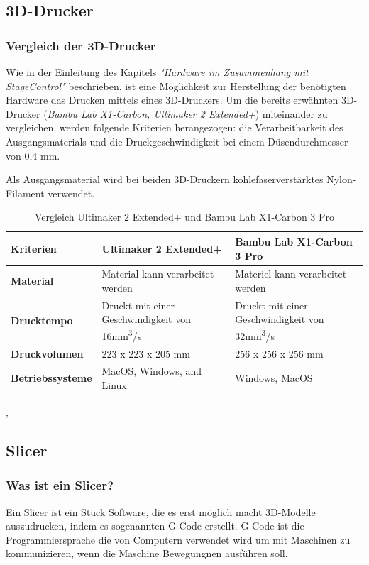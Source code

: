 \subsection{3D-Drucker}

\subsubsection{Vergleich der 3D-Drucker}
Wie in der Einleitung des Kapitels \emph{"Hardware im Zusammenhang mit StageControl"} beschrieben, ist eine Möglichkeit zur Herstellung der benötigten Hardware das Drucken mittels eines 3D-Druckers. Um die bereits erwähnten 3D-Drucker (\emph{Bambu Lab X1-Carbon, Ultimaker 2 Extended+}) miteinander zu vergleichen, werden folgende Kriterien herangezogen: die Verarbeitbarkeit des Ausgangsmaterials und die Druckgeschwindigkeit bei einem Düsendurchmesser von 0,4 mm. 

Als Ausgangsmaterial wird bei beiden 3D-Druckern kohlefaserverstärktes Nylon-Filament verwendet.

\begin{table} [H]
	\begin{tabular}{ |p{2.7cm} |p{4.8cm}|p{4.8cm}| }
		\hline
		 \textbf{Kriterien} & \textbf{Ultimaker 2 Extended+}& \textbf{Bambu Lab X1-Carbon 3 Pro}\\
		\hline
		\textbf{Material} & Material kann verarbeitet werden & Materiel kann verarbeitet werden   \\ 
		\hline
		\textbf{Drucktempo} & Druckt mit einer Geschwindigkeit von 16mm\textsuperscript{3}/s & Druckt mit einer Geschwindigkeit von 32mm\textsuperscript{3}/s   \\  
		\hline
		\textbf{Druckvolumen} & 223 x 223 x 205 mm & 256 x 256 x 256 mm \\
		\hline
		\textbf{Betriebssysteme} & MacOS, Windows, and Linux & Windows, MacOS \\
		\hline
	\end{tabular}
	\caption{Vergleich  Ultimaker 2 Extended+ und Bambu Lab X1-Carbon 3 Pro}
\end{table}
\cite{BambuLabX1-Carbon3DPrinter-Specifications}, \cite{Ultimaker2Extended+-Specification}

\subsection{Slicer}
\subsubsection{Was ist ein Slicer?}
Ein Slicer ist ein Stück Software, die es erst möglich macht 3D-Modelle auszudrucken, indem es sogenannten G-Code erstellt. G-Code ist die Programmiersprache die von Computern verwendet wird um mit Maschinen zu kommunizieren, wenn die Maschine Bewegungnen ausführen soll. 
\cite{Slicer_G-Code}


